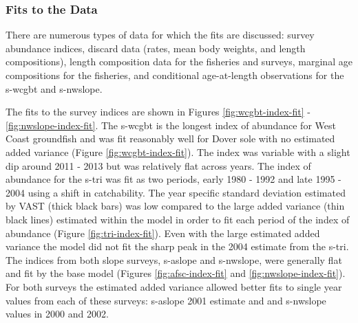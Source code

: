 \documentclass[11pt,
  english,
  a4paper,
]{article}
\begin{document}

\hypertarget{fits-to-the-data}{%
\subsubsection{Fits to the Data}\label{fits-to-the-data}}

\leavevmode\tagmcend\tagstructend


There are numerous types of data for which the fits are discussed: survey abundance indices, discard data (rates, mean body weights, and length compositions), length composition data for the fisheries and surveys, marginal age compositions for the fisheries, and conditional age-at-length observations for the \gls{s-wcgbt} and \gls{s-nwslope}.

\leavevmode\tagmcend\tagstructend\par


The fits to the survey indices are shown in Figures \ref{fig:wcgbt-index-fit} - \ref{fig:nwslope-index-fit}. The \gls{s-wcgbt} is the longest index of abundance for West Coast groundfish and was fit reasonably well for Dover sole with no estimated added variance (Figure \ref{fig:wcgbt-index-fit}). The index was variable with a slight dip around 2011 - 2013 but was relatively flat across years. The index of abundance for the \gls{s-tri} was fit as two periods, early 1980 - 1992 and late 1995 - 2004 using a shift in catchability. The year specific standard deviation estimated by VAST (thick black bars) was low compared to the large added variance (thin black lines) estimated within the model in order to fit each period of the index of abundance (Figure \ref{fig:tri-index-fit}). Even with the large estimated added variance the model did not fit the sharp peak in the 2004 estimate from the \gls{s-tri}. The indices from both slope surveys, \gls{s-aslope} and \gls{s-nwslope}, were generally flat and fit by the base model (Figures \ref{fig:afsc-index-fit} and \ref{fig:nwslope-index-fit}). For both surveys the estimated added variance allowed better fits to single year values from each of these surveys: \gls{s-aslope} 2001 estimate and and \gls{s-nwslope} values in 2000 and 2002.

\leavevmode\tagmcend\tagstructend\par

\end{document}
